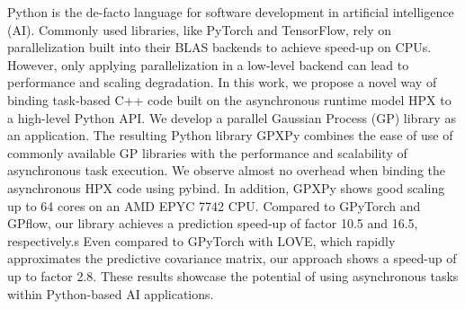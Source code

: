 Python is the de-facto language for software development in artificial intelligence (AI).
Commonly used libraries, like PyTorch and TensorFlow, rely on parallelization built into their BLAS backends to achieve speed-up on CPUs.
However, only applying parallelization in a low-level backend can lead to performance and scaling degradation.
In this work, we propose a novel way of binding task-based C++ code built on the asynchronous runtime model HPX to a high-level Python API.
We develop a parallel Gaussian Process (GP) library as an application.
The resulting Python library GPXPy combines the ease of use of commonly available GP libraries with the performance and scalability of asynchronous task execution.
We observe almost no overhead when binding the asynchronous HPX code using pybind.
In addition, GPXPy shows good scaling up to 64 cores on an AMD EPYC 7742 CPU.
Compared to GPyTorch and GPflow, our library achieves a prediction speed-up of factor 10.5 and 16.5, respectively.s
Even compared to GPyTorch with LOVE, which rapidly approximates the predictive covariance matrix, our approach shows a speed-up of up to factor 2.8.
These results showcase the potential of using asynchronous tasks within Python-based AI applications.
